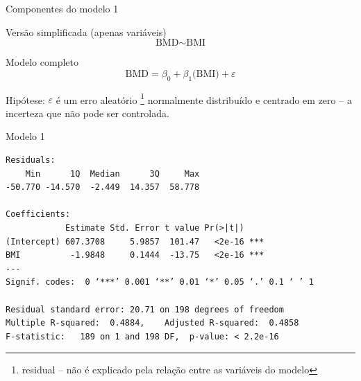 \documentclass{beamer}
\begin{document}
\begin{frame}{\small Componentes do modelo 1}
  \begin{block}{\footnotesize Versão simplificada (apenas variáveis)}
    \footnotesize
    \begin{displaymath}
      \text{BMD} \sim \text{BMI}
    \end{displaymath}
  \end{block}
  \bigskip
  \bigskip
  \begin{block}{Modelo completo}
    \begin{displaymath}
      \text{BMD} =\beta_0 + \beta_1 \text{(BMI)} + \varepsilon
    \end{displaymath}
  \end{block}
  \vfill
  \footnotesize
  Hipótese: $\varepsilon$ é um erro aleatório \footnote{\scriptsize residual -- não é explicado pela relação entre as variáveis do modelo} normalmente distribuído e centrado em zero -- a incerteza que não pode ser controlada.
\end{frame}

\begin{frame}[fragile]{}
  \begin{center}
    \begin{exampleblock}{Modelo 1}
      \tiny
\begin{verbatim}
Residuals:
    Min      1Q  Median      3Q     Max 
-50.770 -14.570  -2.449  14.357  58.778 

Coefficients:
            Estimate Std. Error t value Pr(>|t|)    
(Intercept) 607.3708     5.9857  101.47   <2e-16 ***
BMI          -1.9848     0.1444  -13.75   <2e-16 ***
---
Signif. codes:  0 ‘***’ 0.001 ‘**’ 0.01 ‘*’ 0.05 ‘.’ 0.1 ‘ ’ 1

Residual standard error: 20.71 on 198 degrees of freedom
Multiple R-squared:  0.4884,	Adjusted R-squared:  0.4858 
F-statistic:   189 on 1 and 198 DF,  p-value: < 2.2e-16
\end{verbatim}
    \end{exampleblock}
  \end{center}
\end{frame}
\end{document}
